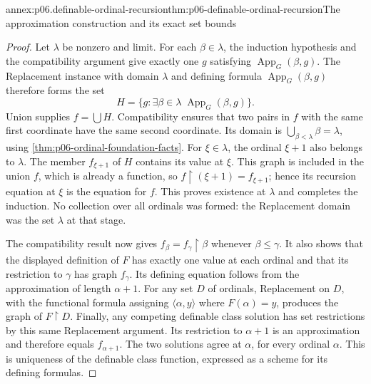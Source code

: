 \begin{annexitem}{annex:p06.definable-ordinal-recursion}{thm:p06-definable-ordinal-recursion}{The approximation construction and its exact set bounds}
\begin{proof}
Let \(\lambda\) be nonzero and limit.  For each \(\beta\in\lambda\),
the induction hypothesis and the compatibility argument give
exactly one \(g\) satisfying \(\operatorname{App}_G(\beta,g)\).
The Replacement instance with domain \(\lambda\) and defining
formula \(\operatorname{App}_G(\beta,g)\) therefore forms the set
\[
 H=\{g:\exists\beta\in\lambda\;
                    \operatorname{App}_G(\beta,g)\}.
\]
Union supplies \(f=\bigcup H\).  Compatibility ensures that
two pairs in \(f\) with the same first coordinate have the same
second coordinate.  Its domain is
\(\bigcup_{\beta<\lambda}\beta=\lambda\), using
\cref{thm:p06-ordinal-foundation-facts}.
For \(\xi\in\lambda\), the ordinal \(\xi+1\) also belongs to
\(\lambda\).  The member \(f_{\xi+1}\) of \(H\) contains its
value at \(\xi\).  This graph is included in the union \(f\),
which is already a function, so
\(f\mathbin{\upharpoonright}(\xi+1)=f_{\xi+1}\); hence its recursion equation at
\(\xi\) is the equation for \(f\).  This proves existence at
\(\lambda\) and completes the induction.  No collection over
all ordinals was formed: the Replacement domain was the set
\(\lambda\) at that stage.

The compatibility result now gives
\(f_\beta=f_\gamma\mathbin{\upharpoonright}\beta\) whenever \(\beta\leq\gamma\).
It also shows that the displayed definition of \(F\) has exactly
one value at each ordinal and that its restriction to \(\gamma\)
has graph \(f_\gamma\).  Its defining equation follows from the
approximation of length \(\alpha+1\).
For any set \(D\) of ordinals, Replacement on \(D\), with the
functional formula assigning
\(\langle\alpha,y\rangle\) where \(F(\alpha)=y\), produces the
graph of \(F\mathbin{\upharpoonright} D\).
Finally, any competing definable class solution has set
restrictions by this same Replacement argument.  Its restriction
to \(\alpha+1\) is an approximation and therefore equals
\(f_{\alpha+1}\).  The two solutions agree at \(\alpha\), for
every ordinal \(\alpha\).  This is uniqueness of the definable
class function, expressed as a scheme for its defining formulas.
\end{proof}
\end{annexitem}

